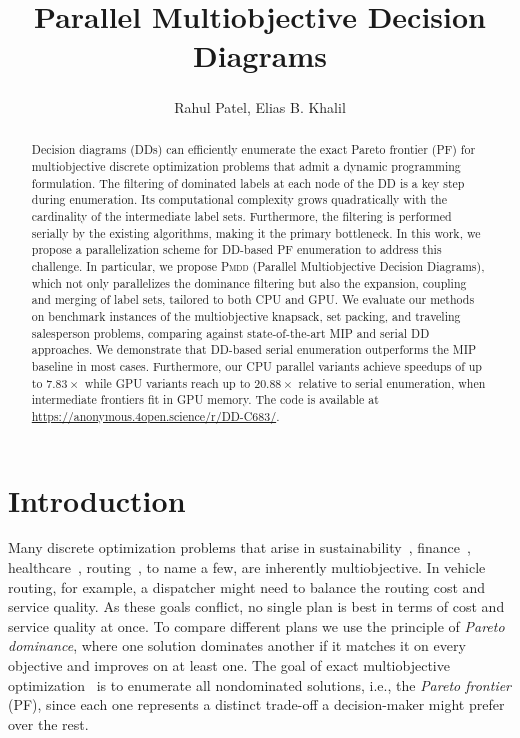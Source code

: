 \documentclass[letterpaper]{article}
\title{Parallel Multiobjective Decision Diagrams} %
\author{
Rahul Patel\textsuperscript{},
Elias B. Khalil\textsuperscript{}
}
\begin{document}
\maketitle

\begin{abstract}
Decision diagrams (DDs) can efficiently enumerate the exact Pareto frontier (PF) for multiobjective discrete optimization problems that admit a dynamic programming formulation.
The filtering of dominated labels at each node of the DD is a key step during enumeration. Its computational complexity grows quadratically with the cardinality of the intermediate label sets.
Furthermore, the filtering is performed serially by the existing algorithms, making it the primary bottleneck.
In this work, we propose a parallelization scheme for DD-based PF enumeration to address this challenge.
In particular, we propose \textsc{Pmdd} (Parallel Multiobjective Decision Diagrams), which not only parallelizes the dominance filtering but also the expansion, coupling and merging of label sets, tailored to both CPU and GPU.
We evaluate our methods on benchmark instances of the multiobjective knapsack, set packing, and traveling salesperson problems, comparing against state-of-the-art MIP and serial DD approaches.
We demonstrate that DD-based serial enumeration outperforms the MIP baseline in most cases.
Furthermore, our CPU parallel variants achieve speedups of up to $7.83\times$ while GPU variants reach up to $20.88\times$ relative to serial enumeration, when intermediate frontiers fit in GPU memory.
The code is available at \url{https://anonymous.4open.science/r/DD-C683/}.
\end{abstract}

\section{Introduction}
\label{sec:intro}

Many discrete optimization problems that arise in sustainability~\citep{flecker2022reducing}, finance~\citep{bonami2009exact}, healthcare~\citep{ehrgott2010mathematical}, routing~\citep{kovacs2015multi}, to name a few, are inherently multiobjective. In vehicle routing, for example, a dispatcher might need to balance the routing cost and service quality. As these goals conflict, no single plan is best in terms of cost and service quality at once. To compare different plans we use the principle of \emph{Pareto dominance}, where one solution dominates another if it matches it on every objective and improves on at least one. The goal of exact multiobjective optimization~\citep{ehrgott2005multicriteria,ehrgott2016exact,miettinen1999nonlinear} is to enumerate all nondominated solutions, i.e., the \emph{Pareto frontier} (PF), since each one represents a distinct trade-off a decision-maker might prefer over the rest. 
\end{document}
